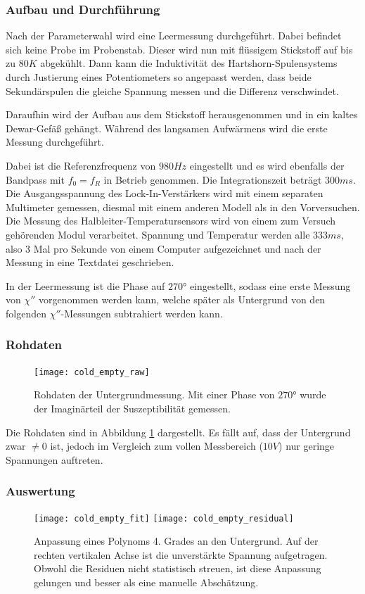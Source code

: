 \documentclass{../Misc/MontavonLaTeX/Montavon}
\begin{document}
\subsubsection{Aufbau und Durchführung}
Nach der Parameterwahl wird eine Leermessung durchgeführt. Dabei befindet sich keine Probe im Probenstab. Dieser wird nun mit flüssigem Stickstoff auf bis zu $80 \unit{K}$ abgekühlt. Dann kann die Induktivität des Hartshorn-Spulensystems durch Justierung eines Potentiometers so angepasst werden, dass beide Sekundärspulen die gleiche Spannung messen und die Differenz verschwindet.

Daraufhin wird der Aufbau aus dem Stickstoff herausgenommen und in ein kaltes Dewar-Gefäß gehängt. Während des langsamen Aufwärmens wird die erste Messung durchgeführt. 

Dabei ist die Referenzfrequenz von $980 \unit{Hz}$ eingestellt und es wird ebenfalls der Bandpass mit $f_0 = f_R$ in Betrieb genommen. Die Integrationszeit beträgt $300 \unit{ms}$. Die Ausgangsspannung des Lock-In-Verstärkers wird mit einem separaten Multimeter gemessen, diesmal mit einem anderen Modell als in den Vorversuchen. Die Messung des Halbleiter-Temperatursensors wird von einem zum Versuch gehörenden Modul verarbeitet. Spannung und Temperatur werden alle $333 \unit{ms}$, also 3 Mal pro Sekunde von einem Computer aufgezeichnet und nach der Messung in eine Textdatei geschrieben.

In der Leermessung ist die Phase auf $270 \unit{\degree}$ eingestellt, sodass eine erste Messung von $\chi''$ vorgenommen werden kann, welche später als Untergrund von den folgenden $\chi''$-Messungen subtrahiert werden kann.

\subsubsection{Rohdaten}
\begin{figure}[htbp]
\centering
\texttt{[image: cold\_empty\_raw]}
\caption{Rohdaten der Untergrundmessung. Mit einer Phase von $270 \unit{\degree}$ wurde der Imaginärteil der Suszeptibilität gemessen.}
\label{fig:cold_empty_raw}
\end{figure}

Die Rohdaten sind in Abbildung \ref{fig:cold_empty_raw} dargestellt. Es fällt auf, dass der Untergrund zwar $\neq 0$ ist, jedoch im Vergleich zum vollen Messbereich ($10 \unit{V}$) nur geringe Spannungen auftreten.

\subsubsection{Auswertung}
\begin{figure}[htbp]
\centering
\texttt{[image: cold\_empty\_fit]}
\texttt{[image: cold\_empty\_residual]}
\caption{Anpassung eines Polynoms 4. Grades an den Untergrund. Auf der rechten vertikalen Achse ist die unverstärkte Spannung aufgetragen. Obwohl die Residuen nicht statistisch streuen, ist diese Anpassung gelungen und besser als eine manuelle Abschätzung.}
\label{fig:cold_empty_fit}
\end{figure}
\end{document}
